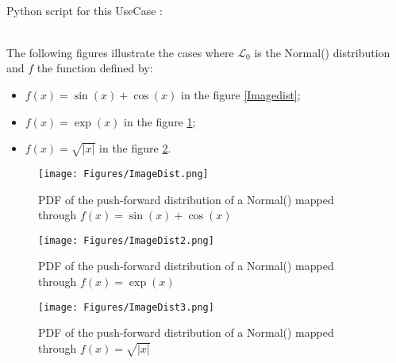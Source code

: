              \textspace\\
             Python script for this UseCase :


             \textspace\\
The following figures illustrate the cases where $\mathcal{L}_0$ is the Normal() distribution and $f$ the function defined by:
\begin{itemize}
  \item  $f(x)=\sin(x) + \cos(x)$ in the figure  \ref{Imagedist};
  \item  $f(x)=\exp(x)$  in the figure   \ref{Imagedist2};
  \item  $f(x)=\sqrt{|x|}$  in the figure   \ref{Imagedist3}.
\end{itemize}




\begin{figure}[H]
  \begin{minipage}{9cm}
    \begin{center}
      \texttt{[image: Figures/ImageDist.png]}
      \caption{PDF of the push-forward distribution of a Normal() mapped through $f(x)=\sin(x) + \cos(x)$}
      \label{Imagedist}
    \end{center}
  \end{minipage}
  \hfill
  \begin{minipage}{9cm}
    \begin{center}
      \texttt{[image: Figures/ImageDist2.png]}
      \caption{PDF of the push-forward distribution of a Normal() mapped through $f(x)=\exp(x)$}
      \label{Imagedist2}
    \end{center}
  \end{minipage}
\end{figure}

\begin{figure}[H]
  \begin{center}
      \texttt{[image: Figures/ImageDist3.png]}
      \caption{PDF of the push-forward distribution of a Normal() mapped through $f(x)=\sqrt{|x|}$}
      \label{Imagedist3}
    \end{center}
\end{figure}
